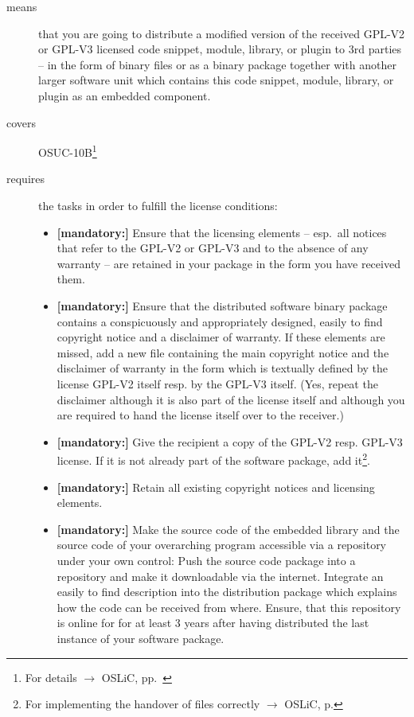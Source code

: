 \begin{description}
\item[means] that you are going to distribute a modified version of the received
GPL-V2 or GPL-V3 licensed code snippet, module, library, or plugin to 3rd
parties -- in the form of binary files or as a binary package together with
another larger software unit which contains this code snippet, module, library,
or plugin as an embedded component.
\item[covers] OSUC-10B\footnote{For details $\rightarrow$ OSLiC, pp.\
\pageref{OSUC-10B-DEF}}
\item[requires] the tasks in order to fulfill the license conditions:
\begin{itemize}

  \item \textbf{[mandatory:]} Ensure that the licensing elements -- esp.\ all
  notices that refer to the GPL-V2 or GPL-V3 and to the absence of any
  warranty -- are retained in your package in the form you have received them.

  \item \textbf{[mandatory:]} Ensure that the distributed software binary
  package contains a conspicuously and appropriately designed, easily to find
  copyright notice and a disclaimer of warranty. If these elements are missed,
  add a new file containing the main copyright notice and the disclaimer of
  warranty in the form which is textually defined by the license GPL-V2 itself
  resp. by the GPL-V3 itself. (Yes, repeat the disclaimer although it is also
  part of the license itself and although you are required to hand the license
  itself over to the receiver.)
  
  \item \textbf{[mandatory:]} Give the recipient a copy of the GPL-V2 resp.
  GPL-V3 license. If it is not already part of the software package, add
  it\footnote{For implementing the handover of files correctly $\rightarrow$
  OSLiC, p. \pageref{DistributingFilesHint}}.
  
  \item \textbf{[mandatory:]} Retain all existing copyright notices and
  licensing elements.

  \item \textbf{[mandatory:]} Make the source code of the embedded library and
  the source code of your overarching program accessible via a repository under
  your own control: Push the source code package into a repository and make it
  downloadable via the internet. Integrate an easily to find description into
  the distribution package which explains how the code can be received from
  where. Ensure, that this repository is online for for at least 3 years after
  having distributed the last instance of your software package.


\end{itemize}
\end{description}
